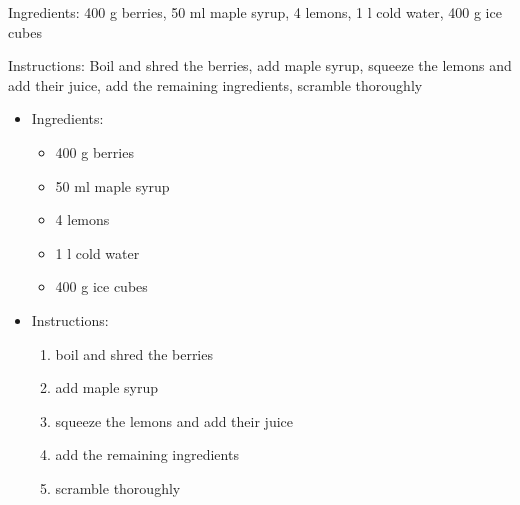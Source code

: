 Ingredients:
400 g berries, 50 ml maple syrup, 4 lemons, 1 l cold water, 400 g ice cubes

\noindent Instructions: Boil and shred the berries, add maple syrup, squeeze the lemons and add their juice, add the remaining ingredients, scramble thoroughly

\begin{itemize}
	\item Ingredients:
	\begin{itemize}
		\item 400 g berries
		\item 50 ml maple syrup 
		\item 4 lemons
		\item 1 l cold water
		\item 400 g ice cubes
	\end{itemize}

	\item Instructions:
	\begin{enumerate}
		\item boil and shred the berries
		\item add maple syrup
		\item squeeze the lemons and add their juice
		\item add the remaining ingredients
		\item scramble thoroughly
	\end{enumerate}
\end{itemize}